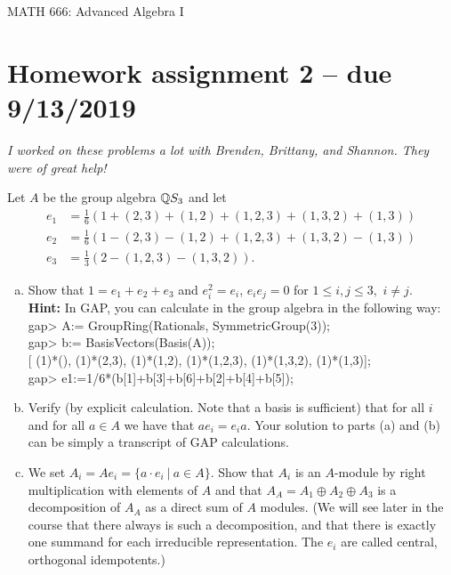 \documentclass[leqno]{article}
\author{Colin Roberts}
\begin{document}
\begin{center}
  \begin{huge}
    MATH 666: Advanced Algebra I
  \end{huge}
\end{center}

\section*{Homework assignment 2 -- due 9/13/2019}

\emph{I worked on these problems a lot with Brenden, Brittany, and Shannon. They were of great help!}

\setcounter{problem}{5}
\begin{problem}
Let $A$ be the group algebra $\mathbb{Q} S_3$ and let
\begin{align*}
    e_1 &= \frac{1}{6}\left( 1+ (2,3)+(1,2)+(1,2,3)+(1,3,2)+(1,3)\right)\\
    e_2 &= \frac{1}{6} \left( 1-(2,3)-(1,2)+(1,2,3)+(1,3,2)-(1,3)\right)\\
    e_3 &= \frac{1}{3} \left( 2 - (1,2,3)-(1,3,2)\right).
\end{align*}
\begin{enumerate}[(a)]
    \item Show that $1=e_1+e_2+e_3$ and $e_i^2=e_i$, $e_i e_j=0$ for $1\leq i,j\leq 3,$ $i\neq j$. \\
    \noindent \textbf{Hint:} In \textsf{GAP}, you can calculate in the group algebra in the following way:\\
    
    \noindent \textsf{gap> A:= GroupRing(Rationals, SymmetricGroup(3));}\\
    \noindent \textsf{gap> b:= BasisVectors(Basis(A));}\\
    \noindent \textsf{[ (1)*(), (1)*(2,3), (1)*(1,2), (1)*(1,2,3), (1)*(1,3,2), (1)*(1,3)];}\\
    \noindent \textsf{gap> e1:=1/6*(b[1]+b[3]+b[6]+b[2]+b[4]+b[5]);}\\
    
    \item Verify (by explicit calculation. Note that a basis is sufficient) that for all $i$ and for all $a\in A$ we have that $ae_i=e_ia$. Your solution to parts (a) and (b) can be simply a transcript of \textsf{GAP} calculations.
    \item We set $A_i=Ae_i = \{a\cdot e_i ~\vert~ a\in A\}$. Show that $A_i$ is an $A$-module by right multiplication with elements of $A$ and that $A_A = A_1 \oplus A_2 \oplus A_3$ is a decomposition of $A_A$ as a direct sum of $A$ modules. (We will see later in the course that there always is such a decomposition, and that there is exactly one summand for each irreducible representation. The $e_i$ are called central, orthogonal idempotents.)
\end{enumerate}
\end{problem}
\end{document}
